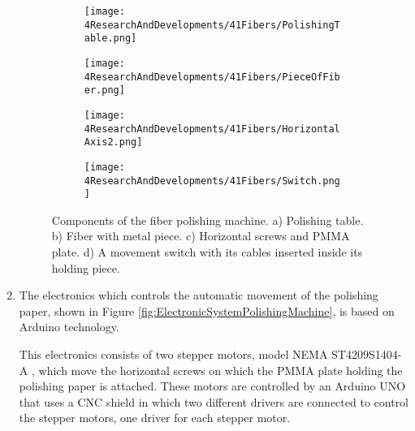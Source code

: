 \begin{enumerate}
\begin{figure}
\centering
    \begin{subfigure}[b]{0.55\textwidth}
    \centering
    \texttt{[image: 4ResearchAndDevelopments/41Fibers/PolishingTable.png]}  
    \caption{\label{subfig:PolishingTable}}
    \end{subfigure}
    \hfill
    \begin{subfigure}[b]{0.3\textwidth}
    \centering
    \texttt{[image: 4ResearchAndDevelopments/41Fibers/PieceOfFiber.png]}  
    \caption{\label{subfig:FiberMetailcPiece}}
    \end{subfigure}
    \hfill
    \begin{subfigure}[b]{0.55\textwidth}
    \centering
    \texttt{[image: 4ResearchAndDevelopments/41Fibers/HorizontalAxis2.png]}  
    \caption{\label{subfig:HorizontalAxis}}
    \end{subfigure}
    \hfill
    \begin{subfigure}[b]{0.4\textwidth}
    \centering
    \texttt{[image: 4ResearchAndDevelopments/41Fibers/Switch.png]}  
    \caption{\label{subfig:3DSwitchPiece}}
    \end{subfigure}
 \caption{Components of the fiber polishing machine. a) Polishing table. b) Fiber with metal piece. c) Horizontal screws and PMMA plate. d) A movement switch with its cables inserted inside its holding piece.}
 \label{fig:PolishingTable}
\end{figure}

\item{} The electronics which controls the automatic movement of the polishing paper, shown in Figure \ref{fig:ElectronicSystemPolishingMachine}, is based on Arduino technology.

This electronics consists of two stepper motors, model NEMA ST4209S1404-A \cite{StepperMotors}, which move the horizontal screws on which the PMMA plate holding the polishing paper is attached. These motors are controlled by an Arduino UNO \cite{ArduinoUNO} that uses a CNC shield \cite{CNCShield} in which two different drivers are connected to control the stepper motors, one driver for each stepper motor.


\end{enumerate}

